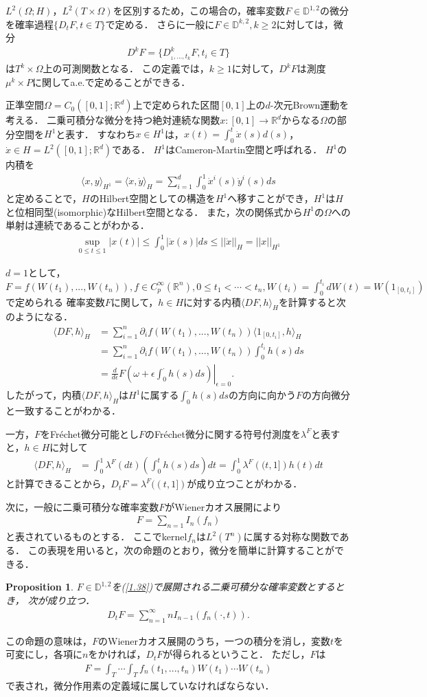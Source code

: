 \documentclass[a4paper,10pt]{jsarticle}
\theoremstyle{plain}
\newtheorem{proposition}{Proposition}
\newcommand{\eq}[1]{\begin{align}#1\end{align}}
\begin{document}
$L^2(\Omega ;H)$，$L^2(T\times\Omega)$を区別するため，この場合の，確率変数$F\in\mathbb{D}^{1,2}$の微分を確率過程$\{D_tF,t\in T\}$で定める．
さらに一般に$F\in\mathbb{D}^{k,2},k\ge 2$に対しては，微分
\eq{D^kF=\{D^k_{_1,...,t_k}F,t_i\in T\}}
は$T^k\times\Omega$上の可測関数となる．
この定義では，$k\ge1$に対して，$D^kF$は測度$\mu^k\times P$に関してa.e.で定めることができる．

正準空間$\Omega=C_0([0,1];\mathbb{R}^d)$上で定められた区間$[0,1]$上の$d$-次元Brown運動を考える．
二乗可積分な微分を持つ絶対連続な関数$x:[0,1]\rightarrow\mathbb{R}^d$からなる$\Omega$の部分空間を$H^1$と表す．
すなわち$x\in H^1$は，$x(t)=\int_0^t\dot{x}(s)d(s)$，$\dot{x}\in H=L^2([0,1];\mathbb{R}^d)$である．
$H^1$はCameron-Martin空間と呼ばれる．
$H^1$の内積を
\eq{\langle x,y\rangle_{H^1}=\langle \dot{x},\dot{y}\rangle_{H}=\sum_{i=1}^d\int_0^1\dot{x}^i(s)\dot{y}^i(s)ds}
と定めることで，$H$のHilbert空間としての構造を$H^1$へ移すことができ，$H^1$は$H$と位相同型(isomorphic)なHilbert空間となる．
また，次の関係式から$H^1$の$\Omega$への単射は連続であることがわかる．
\eq{\sup_{0\le t\le1}\left|x(t)\right|\le\int_0^1\left|\dot{x}(s)\right|ds\le||\dot{x}||_H=||x||_{H^1}}

$d=1$として，$F=f(W(t_1),...,W(t_n)), f\in C^\infty_p(\mathbb{R}^n),0\le t_1<\cdots<t_n,W(t_i)=\int_0^{t_i}dW(t)=W(1_{[0,t_i]})$で定められる
確率変数$F$に関して，$h\in H$に対する内積$\langle DF,h\rangle_H$を計算すると次のようになる．
\eq{\langle DF,h\rangle_H
	&=\sum_{i=1}^n\partial_if(W(t_1),...,W(t_n))\langle 1_{[0,t_i]},h\rangle_H\\
	&=\sum_{i=1}^n\partial_if(W(t_1),...,W(t_n))\int_0^{t_i}h(s)ds\\
	&=\left.\frac{d}{d\epsilon}F\left(\omega+\epsilon\int_0^\cdot h(s)ds\right)\right|_{\epsilon=0}.}
したがって，内積$\langle DF,h\rangle_H$は$H^1$に属する$\int_0^\cdot h(s)ds$の方向に向かう$F$の方向微分と一致することがわかる．

一方，$F$をFr\'echet微分可能とし$F$のFr\'echet微分に関する符号付測度を$\lambda^F$と表すと，$h\in H$に対して
\eq{\langle DF,h\rangle_H
	&=\int_0^1\lambda^F(dt)\left(\int_0^th(s)ds\right)dt
	=\int_0^1\lambda^F\left((t,1]\right)h(t)dt}
と計算できることから，$D_tF=\lambda^F((t,1])$が成り立つことがわかる．

次に，一般に二乗可積分な確率変数$F$がWienerカオス展開により
\eq{F=\sum_{n=1}I_n(f_n)\label{1.38}}
と表されているものとする．
ここでkernel$f_n$は$L^2(T^n)$に属する対称な関数である．
この表現を用いると，次の命題のとおり，微分を簡単に計算することができる．
\begin{proposition}\label{prop1.2.7}
$F\in\mathbb{D}^{1,2}$を(\ref{1.38})で展開される二乗可積分な確率変数とするとき， 次が成り立つ．
\eq{D_tF=\sum^\infty_{n=1}nI_{n-1}\left(f_n(\cdot,t)\right).}
\end{proposition}
この命題の意味は，$F$のWienerカオス展開のうち，一つの積分を消し，変数$t$を可変にし，各項に$n$をかければ，$D_tF$が得られるということ．
ただし，$F$は
\eq{F=\int_T\cdots\int_Tf_n(t_1,...,t_n)W(t_1)\cdots W(t_n)}
で表され，微分作用素の定義域に属していなければならない．
\end{document}
